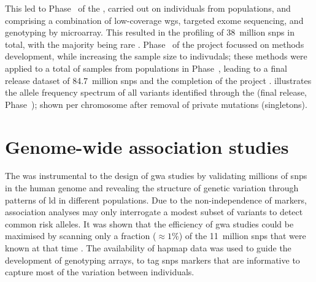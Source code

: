 This led to Phase~ of the , carried out on  individuals from  populations, and comprising a combination of low-coverage \gls{wgs}, targeted exome sequencing, and genotyping by microarray.
This resulted in the profiling of 38~million \glspl{snp} in total, with the majority being rare \citep{GenomesProjectConsortium:2012co}.
Phase~ of the project focussed on methods development, while increasing the sample size to  indivudals; these methods were applied to a total of  samples from  populations in Phase~, leading to a final release dataset of 84.7~million \glspl{snp} and the completion of the project \citep{Auton:2015gk}.
 illustrates the allele frequency spectrum of all variants identified through the  (final release, Phase~); shown per chromosome after removal of private mutations (singletons).



%
\section{Genome-wide association studies}
\label{sec:gwas_intro}
%

The  was instrumental to the design of \gls{gwa} studies by validating millions of \glspl{snp} in the human genome and revealing the structure of genetic variation through patterns of \gls{ld} in different populations.
Due to the non-independence of markers, association analyses may only interrogate a modest subset of variants to detect common risk alleles.
It was shown that the efficiency of \gls{gwa} studies could be maximised by scanning only a fraction (${\approx 1\%}$) of the 11~million \glspl{snp} that were known at that time \citep{deBakker:2005cy,Peer:2006bk}.
The availability of \gls{hapmap} data was used to guide the development of genotyping arrays, to tag \glspl{snp} markers that are informative to capture most of the variation between individuals.

